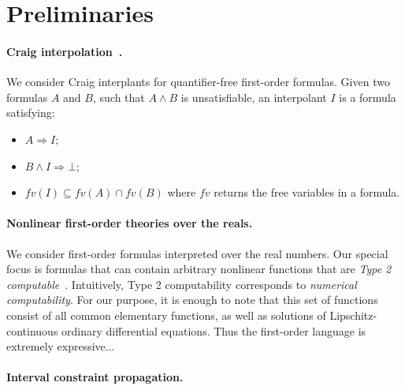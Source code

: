 \section{Preliminaries}
\label{sec:prelim}

\paragraph{Craig interpolation~\cite{MR0104564}.}
We consider Craig interplants for quantifier-free first-order formulas. Given two formulas $A$ and $B$, such that $A ∧ B$ is unsatisfiable, an interpolant $I$ is a formula satisfying:
\begin{itemize}
\item $A ⇒ I$;
\item $B ∧ I ⇒ ⊥$;
\item $fv(I) ⊆ fv(A) ∩ fv(B)$ where $fv$ returns the free variables in a formula.
\end{itemize}

\paragraph{Nonlinear first-order theories over the reals.} 

We consider first-order formulas interpreted over the real numbers. Our special focus is formulas that can contain arbitrary nonlinear functions that are {\em Type 2 computable}~\cite{CAbook,vasco}. Intuitively, Type 2 computability corresponds to {\em numerical computability}. For our purpose, it is enough to note that this set of functions consist of all common elementary functions, as well as solutions of Lipschitz-continuous ordinary differential equations. Thus the first-order language is extremely expressive... 

\paragraph{Interval constraint propagation.}

